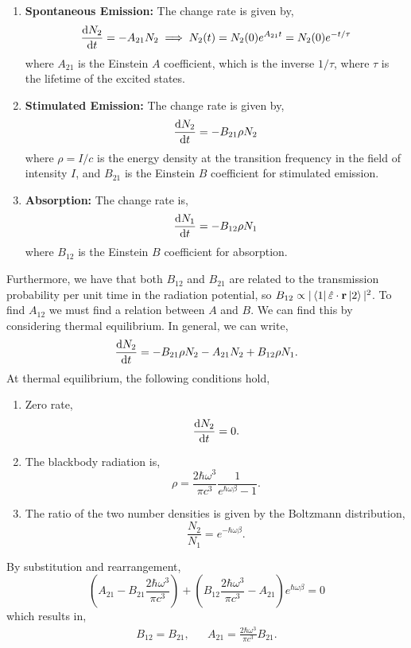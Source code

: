 \documentclass{book}
\begin{document}
\begin{enumerate}
	\item \textbf{Spontaneous Emission:} The change rate is given by,
	\begin{equation}
		\dv{N_2}{t} = -A_{21}N_2 \implies 	N_2(t)=N_2(0)e^{A_{21}t}= N_2(0)e^{-t/\tau}
	\end{equation}
	where $A_{21}$ is the Einstein $A$ coefficient, which is the inverse $1/\tau$, where $\tau$ is the lifetime of the excited states.
	\item \textbf{Stimulated Emission:} The change rate is given by,
	\begin{equation}
		\dv{N_2}{t} = -B_{21}\rho N_2
	\end{equation}
	where $\rho = I/c$ is the energy density at the transition frequency in the field of intensity $I$, and $B_{21}$ is the Einstein $B$ coefficient for stimulated emission.
	\item \textbf{Absorption:} The change rate is,
	\begin{equation}
		\dv{N_1}{t} = - B_{12}\rho N_1
	\end{equation}
	where $B_{12}$ is the Einstein $B$ coefficient for absorption.
\end{enumerate}
Furthermore, we have that both $B_{12}$ and $B_{21}$ are related to the transmission probability per unit time in the radiation potential, so $B_{12} \propto |\bra{1}\hat{\varepsilon}\cdot\vb{r}\ket{2}|^2$. To find $A_{12}$ we must find a relation between $A$ and $B$. We can find this by considering thermal equilibrium. In general, we can write,
\begin{equation}
	\dv{N_2}{t}  = -B_{21}\rho N_2 - A_{21}N_2 + B_{12}\rho N_1. \label{eq:unpump}
\end{equation}
At thermal equilibrium, the following conditions hold,
\begin{enumerate}
	\item Zero rate,
	\begin{equation}
		\dv{N_2}{t} = 0.
	\end{equation}
	\item The blackbody radiation is,
	\begin{equation}
		\rho = \frac{2\hbar \omega^3}{\pi c^3}\frac{1}{e^{\hbar\omega\beta} - 1}.
	\end{equation}
	\item The ratio of the two number densities is given by the Boltzmann distribution,
	\begin{equation}
		\frac{N_2}{N_1} = e^{-\hbar\omega\beta}.
	\end{equation}
\end{enumerate}
By substitution and rearrangement,
\begin{equation}
	\left(A_{21} - B_{21}\frac{2\hbar \omega^3}{\pi c^3}\right) + \left(B_{12}\frac{2\hbar \omega^3}{\pi c^3} - A_{21}\right)e^{\hbar\omega\beta} =0
\end{equation}
which results in,
\begin{align}
	B_{12} = B_{21}, && A_21 = \frac{2\hbar \omega^3}{\pi c^3}B_{21}.
\end{align}
\end{document}
